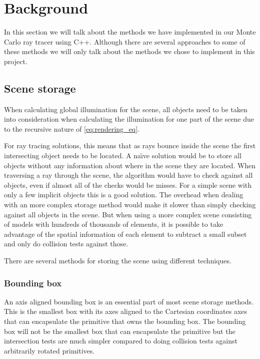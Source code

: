 \documentclass[a4paper, 12pt]{report}
\begin{document}
\chapter{Background} \label{ch:background}

In this section we will talk about the methods we have implemented in our Monte Carlo ray tracer using C++. 
Although there are several approaches to some of these methods we will only talk about the methods we chose to implement in this project.

\section{Scene storage}
When calculating global illumination for the scene, all objects need to be taken into consideration when calculating the illumination for one part of the scene due to the recursive nature of \autoref{eq:rendering_eq}.

For ray tracing solutions, this means that as rays bounce inside the scene the first intersecting object needs to be located.
A na\"{\i}ve solution would be to store all objects without any information about where in the scene they are located.
When traversing a ray through the scene, the algorithm would have to check against all objects, even if almost all of the checks would be misses.
For a simple scene with only a few implicit objects this is a good solution. 
The overhead when dealing with an more complex storage method would make it slower than simply checking against all objects in the scene.
But when using a more complex scene consisting of models with hundreds of thousands of elements, it is possible to take advantage of the spatial information of each element to subtract a small subset and only do collision tests against those.

There are several methods for storing the scene using different techniques.

\subsection{Bounding box}
An axis aligned bounding box is an essential part of most scene storage methods.
This is the smallest box with its axes aligned to the Cartesian coordinates axes that can encapsulate the primitive that owns the bounding box.
The bounding box will not be the smallest box that can encapsulate the primitive but the intersection tests are much simpler compared to doing collision tests against arbitrarily rotated primitives.
\end{document}
